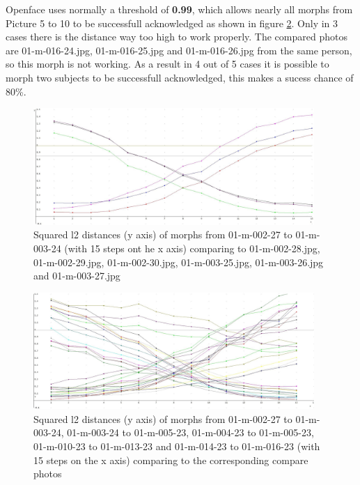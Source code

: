 Openface uses normally a threshold of \textbf{0.99}, which allows nearly all morphs from Picture 5 to 10 to be successfull acknowledged as shown in figure \ref{fig:Result1-5}. Only in 3 cases there is the distance way too high to work properly. The compared photos are 01-m-016-24.jpg, 01-m-016-25.jpg and 01-m-016-26.jpg from the same person, so this morph is not working. As a result in 4 out of 5 cases it is possible to morph two subjects to be successfull acknowledged, this makes a sucess chance of 80\%.

\begin{figure}[htbp] 
	\centering
		\includegraphics[width=0.95\textwidth]{Resources/result1.jpg}
	\caption{Squared l2 distances (y axis) of morphs from 01-m-002-27 to 01-m-003-24 (with 15 steps ont he x axis) comparing to 01-m-002-28.jpg, 01-m-002-29.jpg, 01-m-002-30.jpg, 01-m-003-25.jpg, 01-m-003-26.jpg and 01-m-003-27.jpg}
	\label{fig:Result1}
\end{figure}

\begin{figure}[htbp] 
	\centering
		\includegraphics[width=0.95\textwidth]{Resources/result1-5.jpg}
	\caption{Squared l2 distances (y axis) of morphs from 01-m-002-27 to 01-m-003-24, 01-m-003-24 to 01-m-005-23, 01-m-004-23 to 01-m-005-23, 01-m-010-23 to 01-m-013-23 and 01-m-014-23 to 01-m-016-23 (with 15 steps on the x axis) comparing to the corresponding compare photos}
	\label{fig:Result1-5}
\end{figure}

